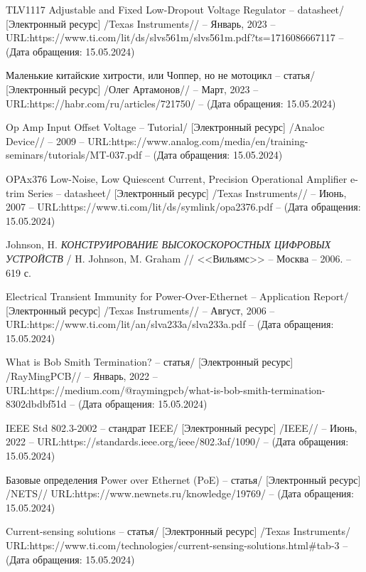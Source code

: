 \begin{thebibliography}{00}
 TLV1117 Adjustable and Fixed Low-Dropout Voltage Regulator
  -- datasheet/
  [Электронный ресурс] /Texas Instruments// -- Январь, 2023 -- 
  URL:https://www.ti.com/lit/ds/slvs561m/slvs561m.pdf?ts=1716086667117
  -- (Дата обращения: 15.05.2024)

 Маленькие китайские хитрости, или Чоппер, но не мотоцикл
-- статья/
[Электронный ресурс] /Олег Артамонов// -- Март, 2023 -- 
URL:https://habr.com/ru/articles/721750/
-- (Дата обращения: 15.05.2024)

 Op Amp Input Offset Voltage 
-- Tutorial/
[Электронный ресурс] /Analoc Device// --  2009 -- 
URL:https://www.analog.com/media/en/training-seminars/tutorials/MT-037.pdf
-- (Дата обращения: 15.05.2024)

 OPAx376 Low-Noise, Low Quiescent Current, Precision Operational Amplifier
e-trim Series
-- datasheet/
[Электронный ресурс] /Texas Instruments// -- Июнь, 2007 -- 
URL:https://www.ti.com/lit/ds/symlink/opa2376.pdf
-- (Дата обращения: 15.05.2024)

 Johnson, H.
\emph{КОНСТРУИРОВАНИЕ ВЫСОКОСКОРОСТНЫХ ЦИФРОВЫХ УСТРОЙСТВ} / H. Johnson, M. Graham // <<Вильямс>> --
Москва -- 2006. -- 619 с.

 Electrical Transient Immunity for 
Power-Over-Ethernet
-- Application Report/
[Электронный ресурс] /Texas Instruments// -- Август, 2006 -- 
URL:https://www.ti.com/lit/an/slva233a/slva233a.pdf
-- (Дата обращения: 15.05.2024)

 What is Bob Smith Termination?
-- статья/
[Электронный ресурс] /RayMingPCB// -- Январь, 2022 -- 
URL:https://medium.com/@raymingpcb/what-is-bob-smith-termination-8302dbdbf51d
-- (Дата обращения: 15.05.2024)


 IEEE Std 802.3-2002
-- стандрат IEEE/
[Электронный ресурс] /IEEE// -- Июнь, 2022 -- 
URL:https://standards.ieee.org/ieee/802.3af/1090/
-- (Дата обращения: 15.05.2024)

 Базовые определения Power over Ethernet (PoE)
-- статья/
[Электронный ресурс] /NETS// 
URL:https://www.newnets.ru/knowledge/19769/
-- (Дата обращения: 15.05.2024)


 Current-sensing solutions
-- статья/
[Электронный ресурс] /Texas Instruments/ 
URL:https://www.ti.com/technologies/current-sensing-solutions.html\#tab-3
-- (Дата обращения: 15.05.2024)


\end{thebibliography}
